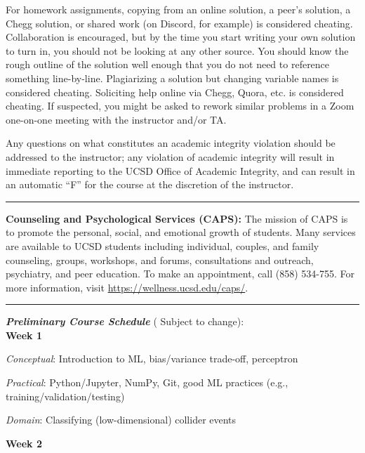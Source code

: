\documentclass[12pt]{article}
\begin{document}
For homework assignments, copying from an online solution, a peer's solution, a Chegg solution, or shared work (on Discord, for example) is considered cheating.
Collaboration is encouraged, but by the time you start writing your own solution to turn in, you should not be looking at any other source.
You should know the rough outline of the solution well enough that you do not need to reference something line-by-line.
Plagiarizing a solution but changing variable names is considered cheating.
Soliciting help online via Chegg, Quora, etc. is considered cheating.
If suspected, you might be asked to rework similar problems in a Zoom one-on-one meeting with the instructor and/or TA.

Any questions on what constitutes an academic integrity violation should be addressed to the instructor; any violation of academic integrity will result in immediate reporting to the UCSD Office of Academic Integrity, and can result in an automatic ``F'' for the course at the discretion of the instructor.

\begin{center}
	\rule{\textwidth}{0.5pt}
\end{center}

\noindent\textbf{Counseling and Psychological Services (CAPS):} The mission of CAPS is to promote the personal, social, and emotional growth of students.
Many services are available to UCSD students including individual, couples, and family counseling, groups, workshops, and forums, consultations and outreach, psychiatry, and peer education.
To make an appointment, call (858) 534-755.
For more information, visit \href{https://wellness.ucsd.edu/caps/}{https://wellness.ucsd.edu/caps/}.

\begin{center}
	\rule{\textwidth}{0.5pt}
\end{center}

\noindent\textbf{\emph{Preliminary Course Schedule}} ({\color{Orange} Subject to change}):\\

\textbf{Week 1}

\emph{Conceptual}: Introduction to ML, bias/variance trade-off, perceptron

\emph{Practical}: Python/Jupyter, NumPy, Git, good ML practices (e.g., training/validation/testing)

\emph{Domain}: Classifying (low-dimensional) collider events

\textbf{Week 2}
\end{document}

